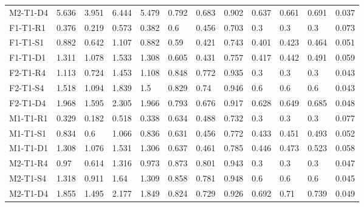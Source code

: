 \begin{table}[ht]
\begin{tabular}{llllllllllll}
  M2-T1-D4 & 5.636 & 3.951 & 6.444 & 5.479 & 0.792 & 0.683 & 0.902 & 0.637 & 0.661 & 0.691 & 0.037 \\ 
  F1-T1-R1 & 0.376 & 0.219 & 0.573 & 0.382 & 0.6 & 0.456 & 0.703 & 0.3 & 0.3 & 0.3 &    0.073  \\ 
  F1-T1-S1 & 0.882 & 0.642 & 1.107 & 0.882 & 0.59 & 0.421 & 0.743 & 0.401 & 0.423 & 0.464 &    0.051  \\ 
  F1-T1-D1 & 1.311 & 1.078 & 1.533 & 1.308 & 0.605 & 0.431 & 0.757 & 0.417 & 0.442 & 0.491 &    0.059  \\ 
  F2-T1-R4 & 1.113 & 0.724 & 1.453 & 1.108 & 0.848 & 0.772 & 0.935 & 0.3 & 0.3 & 0.3 &    0.043  \\ 
  F2-T1-S4 & 1.518 & 1.094 & 1.839 & 1.5 & 0.829 & 0.74 & 0.946 & 0.6 & 0.6 & 0.6 &    0.043  \\ 
  F2-T1-D4 & 1.968 & 1.595 & 2.305 & 1.966 & 0.793 & 0.676 & 0.917 & 0.628 & 0.649 & 0.685 &    0.048  \\ 
  M1-T1-R1 & 0.329 & 0.182 & 0.518 & 0.338 & 0.634 & 0.488 & 0.732 & 0.3 & 0.3 & 0.3 &    0.077  \\ 
  M1-T1-S1 & 0.834 & 0.6 & 1.066 & 0.836 & 0.631 & 0.456 & 0.772 & 0.433 & 0.451 & 0.493 &    0.052  \\ 
  M1-T1-D1 & 1.308 & 1.076 & 1.531 & 1.306 & 0.637 & 0.461 & 0.785 & 0.446 & 0.473 & 0.523 &    0.058  \\ 
  M2-T1-R4 & 0.97 & 0.614 & 1.316 & 0.973 & 0.873 & 0.801 & 0.943 & 0.3 & 0.3 & 0.3 &    0.047  \\ 
  M2-T1-S4 & 1.318 & 0.911 & 1.64 & 1.309 & 0.858 & 0.781 & 0.948 & 0.6 & 0.6 & 0.6 &    0.045  \\ 
  M2-T1-D4 & 1.855 & 1.495 & 2.177 & 1.849 & 0.824 & 0.729 & 0.926 & 0.692 & 0.71 & 0.739 &    0.049  \\ 
   \hline
\end{tabular}
\end{table}
